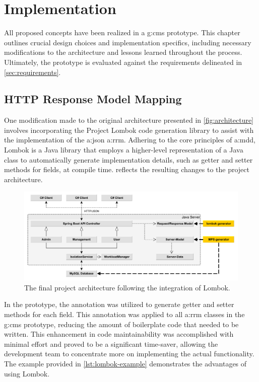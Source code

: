 \chapter{Implementation}\label{ch:impl}%

All proposed concepts have been realized in a \gls{g:cms} prototype. This chapter outlines crucial design choices and implementation specifics, including necessary modifications to the architecture and lessons learned throughout the process. Ultimately, the prototype is evaluated against the requirements delineated in \cref{sec:requirements}.

\section{HTTP Response Model Mapping}\label{sec:impl-lombok}

One modification made to the original architecture presented in \vref{fig:architecture} involves incorporating the Project Lombok code generation library to assist with the implementation of the \gls{a:json} \gls{a:rrm}. Adhering to the core principles of \gls{a:mdd}, Lombok is a Java library that employs a higher-level representation of a Java class to automatically generate implementation details, such as getter and setter methods for fields, at compile time.  reflects the resulting changes to the project architecture.

\begin{figure}[H]
\centering
\includegraphics[width=\textwidth]{images/big-picture}
\caption{The final project architecture following the integration of Lombok.}
\label{fig:architecture-with-lombok}
\end{figure}

In the prototype, the  annotation was utilized to generate getter and setter methods for each field. This annotation was applied to all \gls{a:rrm} classes in the \gls{g:cms} prototype, reducing the amount of boilerplate code that needed to be written. This enhancement in code maintainability was accomplished with minimal effort and proved to be a significant time-saver, allowing the development team to concentrate more on implementing the actual functionality. The example provided in \vref{lst:lombok-example} demonstrates the advantages of using Lombok.

